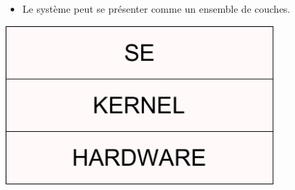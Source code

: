 \subsection{\subsectitle}

\begin{frame}{\sectitle}
\begin{block}{\subsectitle}

\begin{itemize}
    \item Le système peut se présenter comme un ensemble de couches.
\end{itemize}

\end{block}

\begin{center}
\includegraphics[width=0.75\textwidth]{images/Couches.pdf}
\end{center}

\end{frame}




